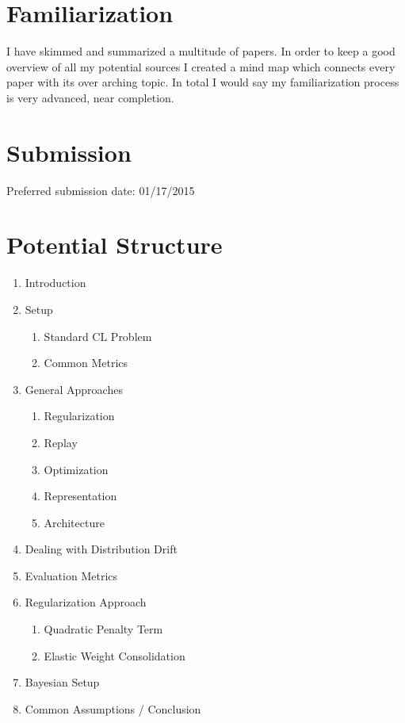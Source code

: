 \documentclass[12pt, a4paper]{report}
\begin{document}
\section*{Familiarization}
	I have skimmed and summarized a multitude of papers. In order to keep a good overview of all my potential sources I created a mind map which connects every paper with its over arching topic. In total I would say my familiarization process is very advanced, near completion.
\section*{Submission}
	Preferred submission date: 01/17/2015
\section*{Potential Structure}
\begin{enumerate}
	\item Introduction
	\item Setup
	\begin{enumerate}
		\item Standard CL Problem
		\item Common Metrics
	\end{enumerate}
	\item General Approaches
	\begin{enumerate}
		\item Regularization
		\item Replay
		\item Optimization
		\item Representation
		\item Architecture
	\end{enumerate}
	\item Dealing with Distribution Drift
	\item Evaluation Metrics
	\item Regularization Approach
	\begin{enumerate}
		\item Quadratic Penalty Term
		\item Elastic Weight Consolidation
	\end{enumerate}
	\item Bayesian Setup
	\item Common Assumptions / Conclusion
\end{enumerate}
\end{document}
